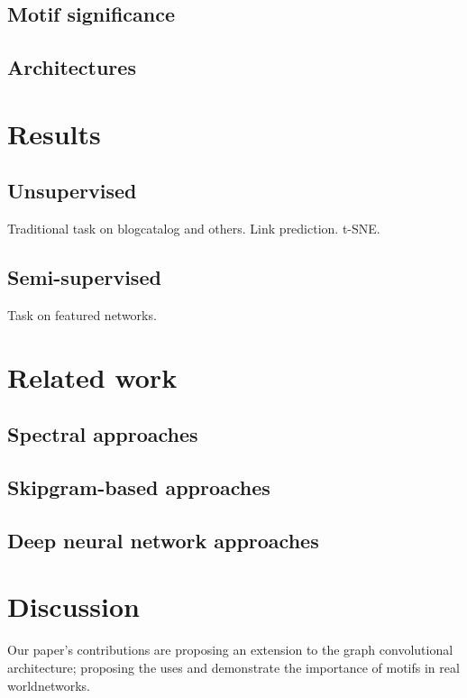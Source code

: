 \documentclass{article}
\theoremstyle{definition}
\begin{document}
\subsection{Motif significance}

\subsection{Architectures}

\section{Results}

\subsection{Unsupervised}

Traditional task on blogcatalog and others.
Link prediction.
t-SNE.

\subsection{Semi-supervised}

Task on featured networks.

\section{Related work}

\subsection{Spectral approaches}

\subsection{Skipgram-based approaches }

\subsection{Deep neural network approaches}

\section{Discussion}

Our paper's contributions are proposing an extension to the graph convolutional 
architecture; proposing the uses and demonstrate the importance of motifs in
real worldnetworks.
\end{document}
